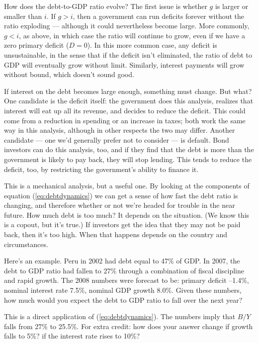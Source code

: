\documentclass[letterpaper,12pt]{article}
\begin{document}
How does the debt-to-GDP ratio evolve?  
The first issue is whether $g$ is larger or smaller than $i$.  
If $g>i$, then a government can run deficits forever without 
the ratio exploding --- although it could nevertheless become large.  
More commonly, $ g<i$, as above, 
in which case the ratio 
will continue to grow, even if we have a zero primary deficit ($D = 0$).
In this more common case, any deficit is unsustainable, 
in the sense that if the deficit isn't eliminated, 
the ratio of debt to GDP will eventually grow without limit.  
Similarly, interest payments will grow without bound,
which doesn't sound good. 


If interest on the debt becomes large enough, something must change.
But what?
One candidate is the deficit itself:  the government 
does this analysis, realizes that interest will eat up 
all its revenue, and decides to reduce the deficit.  
This could come from a reduction in spending or an increase in taxes; 
both work the same way in this analysis, although  
in other respects the two may differ.  
Another candidate --- one we'd generally prefer not to consider --- 
is default.
Bond investors can do this analysis, too, 
and if they find that the debt is more than the government 
is likely to pay back, they will stop lending. 
This tends to reduce the deficit, too, 
by restricting the government's ability to finance it.  


This is a mechanical analysis, but a useful one. 
By looking at the components of equation (\ref{eq:debtdynamics}) 
we can get a sense of how fast the debt ratio is changing, 
and therefore whether or not we're headed for trouble in the near future.
How much debt is too much?  
It depends on the situation.
(We know this is a copout, but it's true.)
If investors get the idea that they may not be paid back, 
then it's too high.  
When that happens depends on the country and circumstances. 


Here's an example.  Peru in 2002 had debt equal to 47\% of GDP.  
In 2007, the debt to GDP ratio had fallen to 27\% through a combination
of fiscal discipline and rapid growth.  
The 2008 numbers were forecast to be:  primary deficit --1.4\%, 
nominal interest rate 7.5\%, 
nominal GDP growth 8.0\%.  
Given these numbers, how much would you expect the debt to GDP 
ratio to fall over the next year?  

This is a direct application of (\ref{eq:debtdynamics}).
The numbers imply that $B/Y$ falls from 27\% to 25.5\%.  
For extra credit:  how does your answer change if growth 
falls to 5\%?  if the interest rate rises to 10\%?  
\end{document}
